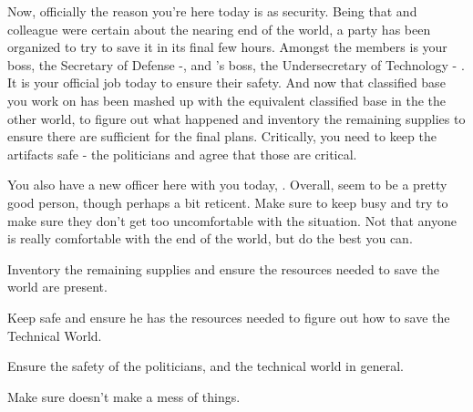 \documentclass[char]{guildcamp3}
\begin{document}
Now, officially the reason you're here today is as security. Being that \cSciOne{\informal} and \cSciOne{\their} colleague were certain about the nearing end of the world, a party has been organized to try to save it in its final few hours. Amongst the members is your boss, the Secretary of Defense -\cPoliOne{\intro}, and \cSciOne{\informal}'s boss, the Undersecretary of Technology - \cPoliTwo{\intro}. It is your official job today to ensure their safety. And now that classified base you work on has been mashed up with the equivalent classified base in the the other world, to figure out what happened and inventory the remaining supplies to ensure there are sufficient for the final plans. Critically, you need to keep the artifacts safe - the politicians and \cSciOne{\informal} agree that those are critical. 

You also have a new officer here with you today, \cSpecOpTwo{\intro}. Overall, \cSpecOpTwo{\they} seem to be a pretty good person, though perhaps a bit reticent. Make sure to keep \cSpecOpTwo{\them} busy and try to make sure they don't get too uncomfortable with the situation. Not that anyone is really comfortable with the end of the world, but do the best you can. 




\begin{itemz}[Goals]
  \item Inventory the remaining supplies and ensure the resources needed to save the world are present.
  \item Keep \cSciOne{\informal{}} safe and ensure he has the resources needed to figure out how to save the Technical World. 
  \item Ensure the safety of the politicians, and the technical world in general.
  \item Make sure \cRogueTwo{\full{}} doesn't make a mess of things. 
\end{itemz}
\end{document}
